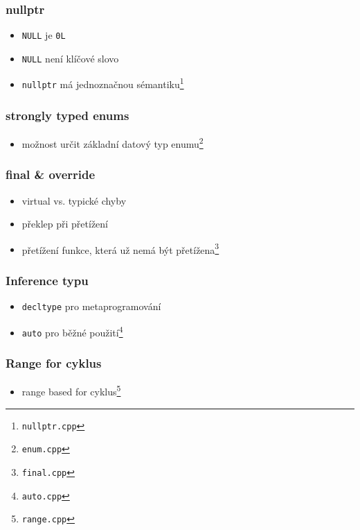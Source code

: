 
\begin{frame} \frametitle{nullptr}
	\begin{itemize}
		\item{\texttt{NULL} je \texttt{0L}}
		\item{\texttt{NULL} není klíčové slovo}
		\item{\texttt{nullptr} má jednoznačnou sémantiku\footnote{\texttt{nullptr.cpp}}}
	\end{itemize}
\end{frame}

\begin{frame} \frametitle{strongly typed enums}
	\begin{itemize}
		\item{možnost určit základní datový typ enumu\footnote{\texttt{enum.cpp}}}
	\end{itemize}
\end{frame}

\begin{frame} \frametitle{final \& override}
	\begin{itemize}
		\item{virtual vs. typické chyby}
		\item{překlep při přetížení}
		\item{přetížení funkce, která už nemá být přetížena\footnote{\texttt{final.cpp}}}
	\end{itemize}
\end{frame}

\begin{frame} \frametitle{Inference typu}
	\begin{itemize}
		\item{\texttt{decltype} pro metaprogramování}
		\item{\texttt{auto} pro běžné použití\footnote{\texttt{auto.cpp}}}
	\end{itemize}
\end{frame}

\begin{frame} \frametitle{Range for cyklus}
	\begin{itemize}
		\item{range based for cyklus\footnote{\texttt{range.cpp}}}
	\end{itemize}
\end{frame}

